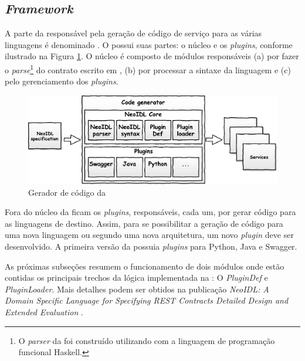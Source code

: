 \subsection{\textit{Framework}}
\label{frameNeoIDL}
\vspace{-6mm}

A parte da \neoidl{} responsável pela geração de código de
serviço para as várias linguagens é denominado \framework{} \neoidl{}. O
\framework{} \neoidl{} possui suas partes: o núcleo e os \textit{plugins},
conforme ilustrado na Figura \ref{fig:programGenerator}.
O núcleo é composto de módulos responsáveis (a) por fazer o \textit{parse}\footnote{O \textit{parser} da \neoidl{}
foi construído utilizando \bnfc{} \cite{ranta-bnfc:2012} com a linguagem de
programação funcional Haskell.}
do contrato escrito em \neoidl{}, (b) por processar a sintaxe da linguagem \neoidl{} e (c) pelo gerenciamento dos \textit{plugins}.

\begin{figure}[h]
\begin{center}
\includegraphics[width=120mm,trim=0cm 0cm 0cm
0cm]{img/NeoIDLCodeGenerator.pdf}
\vspace{-.5cm}
\end{center}
\caption{Gerador de código da \neoidl{}}
\label{fig:programGenerator}
\end{figure}

Fora do núcleo da \neoidl{} ficam os \textit{plugins}, responsáveis,
cada um, por gerar código para as linguagens de destino. Assim, para se
possibilitar a geração de código para uma nova linguagem ou segundo uma nova arquitetura, um
novo \textit{plugin} deve ser desenvolvido. A primeira versão da \neoidl{}
possuia \textit{plugins} para Python, Java e Swagger.

As próximas subseções resumem o funcionamento de
dois módulos onde estão contidas os principais trechos da lógica implementada na \neoidl{}: O
\textit{PluginDef} e \textit{PluginLoader}. Mais detalhes podem ser obtidos na
publicação \textit{NeoIDL: A Domain Specific Language for Specifying REST
Contracts Detailed Design and Extended Evaluation} \cite{lima2015neoidl}.
 

